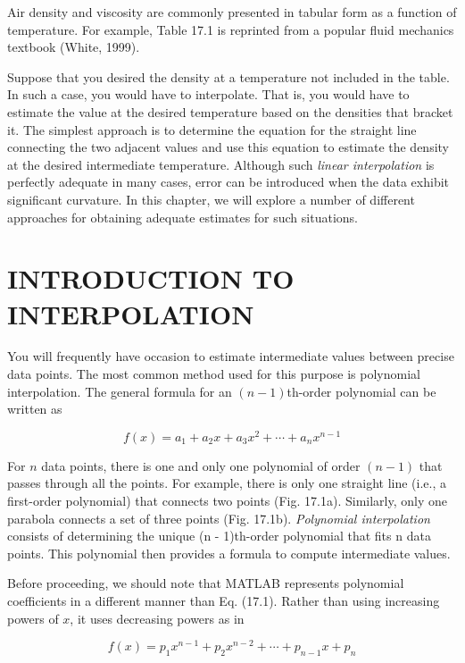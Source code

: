 \documentclass[../main.tex]{subfiles}
\begin{document}
Air density and viscosity are commonly presented in tabular form as a function of
temperature. For example, Table 17.1 is reprinted from a popular fluid mechanics textbook
(White, 1999).

Suppose that you desired the density at a temperature not included in the table. In such
a case, you would have to interpolate. That is, you would have to estimate the value at the desired temperature based on the densities that bracket it. The simplest approach is to determine the equation for the straight line connecting the two adjacent values and use this
equation to estimate the density at the desired intermediate temperature. Although such
\textit{linear interpolation} is perfectly adequate in many cases, error can be introduced when the
data exhibit significant curvature. In this chapter, we will explore a number of different
approaches for obtaining adequate estimates for such situations.


\label{cha:cha_P_17_1} %
\section{INTRODUCTION TO INTERPOLATION}

\noindent You will frequently have occasion to estimate intermediate values between precise data
points. The most common method used for this purpose is polynomial interpolation. The
general formula for an $(n - 1)$th-order polynomial can be written as

\begin{equation}
	\tag{17.1}
	f(x) = a_1 + a_2 x + a_3 x^2 + \cdots + a_n x^{n-1}
\end{equation}

For $n$ data points, there is one and only one polynomial of order $(n - 1)$ that passes through
all the points. For example, there is only one straight line (i.e., a first-order polynomial)
that connects two points (Fig. 17.1a). Similarly, only one parabola connects a set of three
points (Fig. 17.1b). \textit{Polynomial interpolation} consists of determining the unique (n - 1)th-order polynomial that fits n data points. This polynomial then provides a formula to
compute intermediate values.

Before proceeding, we should note that MATLAB represents polynomial coefficients
in a different manner than Eq. (17.1). Rather than using increasing powers of $x$, it uses decreasing powers as in

\begin{equation}
	\tag{17.2}
	f(x) = p_1 x ^ {n-1} + p_2 x ^ {n-2} + \cdots + p_{n-1} x + p_n
\end{equation}
\end{document}
